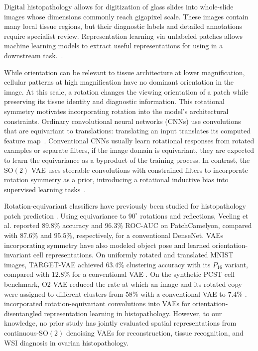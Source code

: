 \documentclass{midl}
\newcommand{\SOtwo}{\mathrm{SO}(2)}
\begin{document}
Digital histopathology allows for digitization of glass slides into whole-slide images whose dimensions commonly reach gigapixel scale. These images contain many local tissue regions, but their diagnostic labels and detailed annotations require specialist review. Representation learning via unlabeled patches allows machine learning models to extract useful representations for using in a downstream task.~\cite{litjens_survey_2017,song_artificial_2023,tellez_neural_2021}.

While orientation can be relevant to tissue architecture at lower magnification, cellular patterns at high magnification have no dominant orientation in the image. At this scale, a rotation changes the viewing orientation of a patch while preserving its tissue identity and diagnostic information. This rotational symmetry motivates incorporating rotation into the model's architectural constraints. Ordinary convolutional neural networks (CNNs) use convolutions that are equivariant to translations: translating an input translates its computed feature map~\cite{lecun_gradient_1998,cohen_group_2016}. Conventional CNNs usually learn rotational responses from rotated examples or separate filters, if the image domain is equivariant, they are expected to learn the equivariance as a byproduct of the training process. In contrast, the $\SOtwo$ VAE uses steerable convolutions with constrained filters to incorporate rotation symmetry as a prior, introducing a rotational inductive bias into supervised learning tasks~\cite{cohen_group_2016,cohen_steerable_2017,weiler_general_2019}.

Rotation-equivariant classifiers have previously been studied for histopathology patch prediction \cite{veeling_rotation_2018}. Using equivariance to $90^{\circ}$ rotations and reflections, Veeling et al. reported $89.8\%$ accuracy and $96.3\%$ ROC-AUC on PatchCamelyon, compared with $87.6\%$ and $95.5\%$, respectively, for a conventional DenseNet. VAEs incorporating symmetry have also modeled object pose and learned orientation-invariant cell representations. On uniformly rotated and translated MNIST images, TARGET-VAE achieved $63.4\%$ clustering accuracy with its $P_{16}$ variant, compared with $12.8\%$ for a conventional VAE \cite{nasiri_target_2022}. On the synthetic PCST cell benchmark, O2-VAE reduced the rate at which an image and its rotated copy were assigned to different clusters from $58\%$ with a conventional VAE to $7.4\%$ \cite{burgess_orientation_2024}. \citet{lafarge_orientation_2020} incorporated rotation-equivariant convolutions into VAEs for orientation-disentangled representation learning in histopathology. However, to our knowledge, no prior study has jointly evaluated spatial representations from continuous-$\SOtwo$ denoising VAEs for reconstruction, tissue recognition, and WSI diagnosis in ovarian histopathology. %
\end{document}
